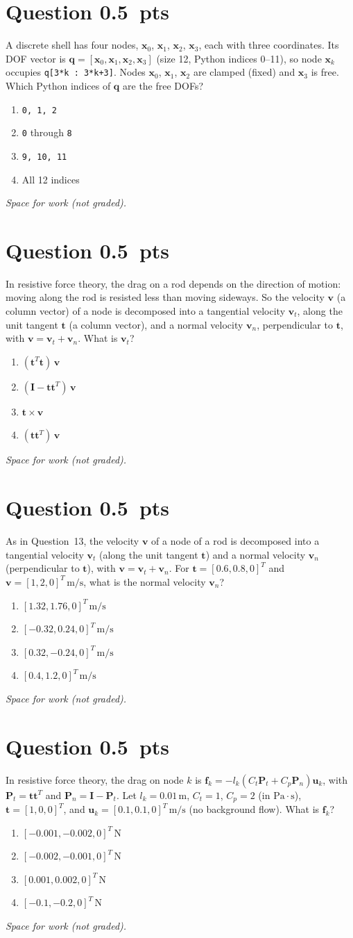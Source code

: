 \documentclass[letterpaper,11pt]{article}
\newcounter{qnum}
\newcommand{\qpts}{0.5}
\newcommand{\mcq}[5]{%
  \clearpage
  \stepcounter{qnum}%
  \section*{Question \theqnum \hfill \normalsize \qpts~pts}
  #1
  \begin{enumerate}[label=(\alph*)]
    \item #2
    \item #3
    \item #4
    \item #5
  \end{enumerate}
  \vspace{3mm}

  \textit{Space for work (not graded).}
}
\begin{document}
%
%
\mcq{A discrete shell has four nodes, $\mathbf{x}_0$, $\mathbf{x}_1$, $\mathbf{x}_2$, $\mathbf{x}_3$, each with three coordinates. Its DOF vector is $\mathbf{q} = [\mathbf{x}_0, \mathbf{x}_1, \mathbf{x}_2, \mathbf{x}_3]$ (size 12, Python indices 0--11), so node $\mathbf{x}_k$ occupies \texttt{q[3*k : 3*k+3]}. Nodes $\mathbf{x}_0$, $\mathbf{x}_1$, $\mathbf{x}_2$ are clamped (fixed) and $\mathbf{x}_3$ is free. Which Python indices of $\mathbf{q}$ are the free DOFs?}
  {\texttt{0, 1, 2}}
  {\texttt{0} through \texttt{8}}
  {\texttt{9, 10, 11}}
  {All 12 indices}

%
%
\mcq{In resistive force theory, the drag on a rod depends on the direction of motion: moving along the rod is resisted less than moving sideways. So the velocity $\mathbf{v}$ (a column vector) of a node is decomposed into a tangential velocity $\mathbf{v}_t$, along the unit tangent $\mathbf{t}$ (a column vector), and a normal velocity $\mathbf{v}_n$, perpendicular to $\mathbf{t}$, with $\mathbf{v} = \mathbf{v}_t + \mathbf{v}_n$. What is $\mathbf{v}_t$?}
  {$(\mathbf{t}^T \mathbf{t})\, \mathbf{v}$}
  {$(\mathbf{I} - \mathbf{t}\mathbf{t}^T)\, \mathbf{v}$}
  {$\mathbf{t} \times \mathbf{v}$}
  {$(\mathbf{t}\mathbf{t}^T)\, \mathbf{v}$}

%
%
\mcq{As in Question~13, the velocity $\mathbf{v}$ of a node of a rod is decomposed into a tangential velocity $\mathbf{v}_t$ (along the unit tangent $\mathbf{t}$) and a normal velocity $\mathbf{v}_n$ (perpendicular to $\mathbf{t}$), with $\mathbf{v} = \mathbf{v}_t + \mathbf{v}_n$. For $\mathbf{t} = [0.6, 0.8, 0]^T$ and $\mathbf{v} = [1, 2, 0]^T\,\mathrm{m/s}$, what is the normal velocity $\mathbf{v}_n$?}
  {$[1.32, 1.76, 0]^T\,\mathrm{m/s}$}
  {$[-0.32, 0.24, 0]^T\,\mathrm{m/s}$}
  {$[0.32, -0.24, 0]^T\,\mathrm{m/s}$}
  {$[0.4, 1.2, 0]^T\,\mathrm{m/s}$}

%
%
\mcq{In resistive force theory, the drag on node $k$ is $\mathbf{f}_k = -l_k \left( C_t \mathbf{P}_t + C_p \mathbf{P}_n \right) \mathbf{u}_k$, with $\mathbf{P}_t = \mathbf{t}\mathbf{t}^T$ and $\mathbf{P}_n = \mathbf{I} - \mathbf{P}_t$. Let $l_k = 0.01\,\mathrm{m}$, $C_t = 1$, $C_p = 2$ (in $\mathrm{Pa \cdot s}$), $\mathbf{t} = [1, 0, 0]^T$, and $\mathbf{u}_k = [0.1, 0.1, 0]^T\,\mathrm{m/s}$ (no background flow). What is $\mathbf{f}_k$?}
  {$[-0.001, -0.002, 0]^T\,\mathrm{N}$}
  {$[-0.002, -0.001, 0]^T\,\mathrm{N}$}
  {$[0.001, 0.002, 0]^T\,\mathrm{N}$}
  {$[-0.1, -0.2, 0]^T\,\mathrm{N}$}
\end{document}
